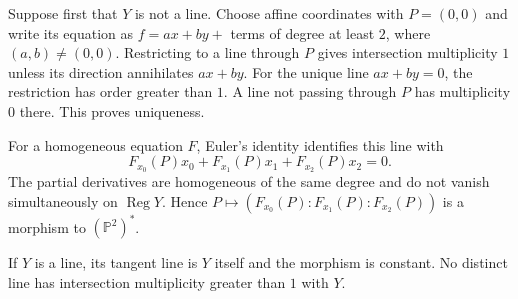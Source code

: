Suppose first that $Y$ is not a line. Choose affine coordinates with $P=(0,0)$ and write its equation as $f=ax+by+$ terms of degree at least $2$, where $(a,b)\ne(0,0)$. Restricting to a line through $P$ gives intersection multiplicity $1$ unless its direction annihilates $ax+by$. For the unique line $ax+by=0$, the restriction has order greater than $1$. A line not passing through $P$ has multiplicity $0$ there. This proves uniqueness.

For a homogeneous equation $F$, Euler's identity identifies this line with
\[F_{x_0}(P)x_0+F_{x_1}(P)x_1+F_{x_2}(P)x_2=0.\]
The partial derivatives are homogeneous of the same degree and do not vanish simultaneously on $\operatorname{Reg}Y$. Hence $P\mapsto(F_{x_0}(P):F_{x_1}(P):F_{x_2}(P))$ is a morphism to $(\mathbb{P}^2)^*$.

If $Y$ is a line, its tangent line is $Y$ itself and the morphism is constant. No distinct line has intersection multiplicity greater than $1$ with $Y$.
